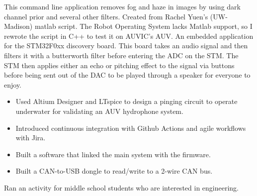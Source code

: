 \documentclass[10pt,a4paper,ragged2e,withhyper]{altacv}
\begin{document}
\begin{paracol}{2}
This command line application removes fog and haze in images by using dark channel prior and several other filters. Created from Rachel Yuen's (UW-Madison) matlab script. The Robot Operating System lacks Matlab support, so I rewrote the script in C++ to test it on AUVIC's AUV.
\divider
{}
An embedded application for the STM32F0xx discovery board. This board takes an audio signal and then filters it with a butterworth filter before entering the ADC on the STM. The STM then applies either an echo or pitching effect to the signal via buttons  before being sent out of the DAC to be played through a speaker for everyone to enjoy.
\divider

\switchcolumn

\begin{itemize}
\item Used Altium Designer and LTspice to design a pinging circuit to operate underwater for validating an AUV hydrophone system.
\item Introduced continuous integration with Github Actions and agile workflows with Jira.
\item Built a software that linked the main system with the firmware.
\item Built a CAN-to-USB dongle to read/write to a 2-wire CAN bus.
\end{itemize}
Ran an activity for middle school students who are interested in engineering.


\end{paracol}
\end{document}
